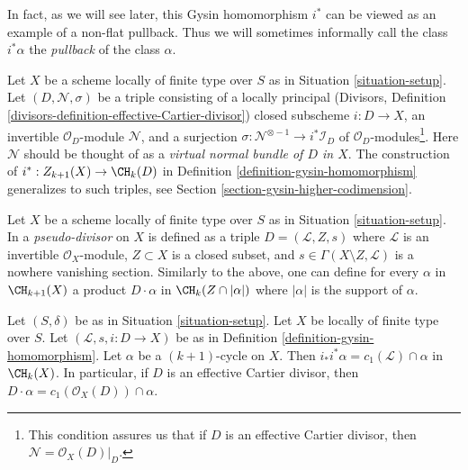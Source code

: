 \noindent
In fact, as we will see later, this Gysin homomorphism $i^*$ can be viewed
as an example of a non-flat pullback. Thus we will sometimes informally
call the class $i^*\alpha$ the {\it pullback} of the class $\alpha$.

\begin{remark}
\label{remark-generalize-to-virtual}
Let $X$ be a scheme locally of finite type over $S$ as in
Situation \ref{situation-setup}. Let $(D, \mathcal{N}, \sigma)$
be a triple consisting of a locally principal (Divisors, Definition
\ref{divisors-definition-effective-Cartier-divisor}) closed subscheme
$i : D \to X$, an invertible $\mathcal{O}_D$-module $\mathcal{N}$, and
a surjection $\sigma : \mathcal{N}^{\otimes -1} \to i^*\mathcal{I}_D$
of $\mathcal{O}_D$-modules\footnote{This condition assures us that if
$D$ is an effective Cartier divisor, then $\mathcal{N} = \mathcal{O}_X(D)|_D$.}.
Here $\mathcal{N}$ should be thought of as
a {\it virtual normal bundle of $D$ in $X$}. The construction of
$i^* : Z_{k + 1}(X) \to \CH_k(D)$ in
Definition \ref{definition-gysin-homomorphism}
generalizes to such triples, see
Section \ref{section-gysin-higher-codimension}.
\end{remark}

\begin{remark}
\label{remark-generalize-to-pseudo-divisor}
Let $X$ be a scheme locally of finite type over $S$ as in
Situation \ref{situation-setup}. In \cite{F} a {\it pseudo-divisor} on $X$
is defined as a triple $D = (\mathcal{L}, Z, s)$ where $\mathcal{L}$
is an invertible $\mathcal{O}_X$-module, $Z \subset X$ is a closed subset,
and $s \in \Gamma(X \setminus Z, \mathcal{L})$ is a nowhere vanishing
section. Similarly to the above, one can define for every $\alpha$
in $\CH_{k + 1}(X)$ a product $D \cdot \alpha$ in $\CH_k(Z \cap |\alpha|)$
where $|\alpha|$ is the support of $\alpha$.
\end{remark}

\begin{lemma}
\label{lemma-support-cap-effective-Cartier}
Let $(S, \delta)$ be as in Situation \ref{situation-setup}. Let $X$ be locally
of finite type over $S$. Let $(\mathcal{L}, s, i : D \to X)$ be as in
Definition \ref{definition-gysin-homomorphism}. Let $\alpha$ be a
$(k + 1)$-cycle on $X$. Then $i_*i^*\alpha = c_1(\mathcal{L}) \cap \alpha$
in $\CH_k(X)$. In particular, if $D$ is an effective Cartier divisor, then
$D \cdot \alpha = c_1(\mathcal{O}_X(D)) \cap \alpha$.
\end{lemma}

